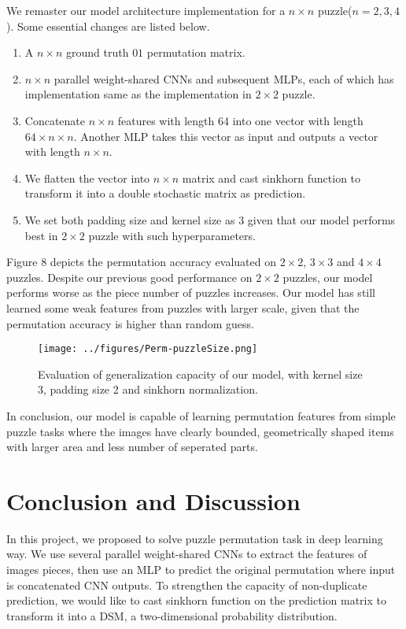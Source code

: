 \documentclass[twocolumn]{article}
\begin{document}
We remaster our model architecture implementation for a $n\times n$ puzzle($n=2, 3, 4$). Some essential changes 
are listed below. 
\begin{enumerate}
    \item A $n\times n$ ground truth $01$ permutation matrix. 
    \item $n\times n$ parallel weight-shared CNNs and subsequent MLPs, each of which has implementation same as 
    the implementation in $2\times 2$ puzzle. 
    \item Concatenate $n\times n$ features with length 64 into one vector with length $64\times n\times n$. 
    Another MLP takes this vector as input and outputs a vector with length $n\times n$. 
    \item We flatten the vector into $n\times n$ matrix and cast sinkhorn function to transform it into 
    a double stochastic matrix as prediction. 
    \item We set both padding size and kernel size as 3 given that our model performs best in $2\times 2$ 
    puzzle with such hyperparameters. 
\end{enumerate}

Figure 8 depicts the permutation accuracy evaluated on $2\times 2$, $3\times 3$ and $4\times 4$ puzzles. 
Despite our previous good performance on $2\times 2$ puzzles, our model performs worse as the piece number of 
puzzles increases. Our model has still learned some weak features from puzzles with larger scale, given that 
the permutation accuracy is higher than random guess. 
\begin{figure}[h]
    \centering
    \texttt{[image: ../figures/Perm-puzzleSize.png]}
    \caption{Evaluation of generalization capacity of our model, with kernel size 3, padding size 2 and sinkhorn 
    normalization.}
\end{figure}


In conclusion, our model is capable of learning permutation features from simple puzzle tasks where the images 
have clearly bounded, geometrically shaped items with larger area and less number of seperated parts. 
\section{Conclusion and Discussion}
In this project, we proposed to solve puzzle permutation task in deep learning way. We use several parallel 
weight-shared CNNs to extract the features of images pieces, then use an MLP to predict the original permutation 
where input is concatenated CNN outputs. To strengthen the capacity of non-duplicate prediction, we would like 
to cast sinkhorn function on the prediction matrix to transform it into a DSM, a two-dimensional probability 
distribution. 
\end{document}
